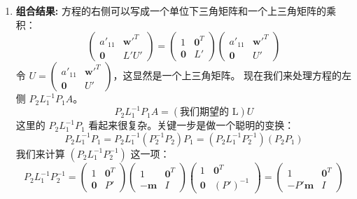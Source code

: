 \documentclass{amsart}
\theoremstyle{plain}
\theoremstyle{definition}
\theoremstyle{remark}
\begin{document}
\begin{enumerate}
我们将这个分解应用到我们的方程中。定义一个分块置换矩阵：
\[
P_2 = \begin{pmatrix} 1 & \mathbf{0}^T \\ \mathbf{0} & P' \end{pmatrix}
\]
将它左乘到方程 $L_1^{-1} P_1 A = \dots$ 的两边：
\[
P_2 (L_1^{-1} P_1 A) = \begin{pmatrix} 1 & \mathbf{0}^T \\ \mathbf{0} & P' \end{pmatrix} \begin{pmatrix} a'_{11} & \mathbf{w'}^T \\ \mathbf{0} & A_{schur} \end{pmatrix} = \begin{pmatrix} a'_{11} & \mathbf{w'}^T \\ \mathbf{0} & P'A_{schur} \end{pmatrix} = \begin{pmatrix} a'_{11} & \mathbf{w'}^T \\ \mathbf{0} & L'U' \end{pmatrix}
\]
	\item \textbf{组合结果:}
方程的右侧可以写成一个单位下三角矩阵和一个上三角矩阵的乘积：
\[
\begin{pmatrix} a'_{11} & \mathbf{w'}^T \\ \mathbf{0} & L'U' \end{pmatrix} = \begin{pmatrix} 1 & \mathbf{0}^T \\ \mathbf{0} & L' \end{pmatrix} \begin{pmatrix} a'_{11} & \mathbf{w'}^T \\ \mathbf{0} & U' \end{pmatrix}
\]
令 $U = \begin{pmatrix} a'_{11} & \mathbf{w'}^T \\ \mathbf{0} & U' \end{pmatrix}$，这显然是一个上三角矩阵。
现在我们来处理方程的左侧 $P_2 L_1^{-1} P_1 A$。
\[
P_2 L_1^{-1} P_1 A = (\text{我们期望的 L}) U
\]
这里的 $P_2 L_1^{-1} P_1$ 看起来很复杂。关键一步是做一个聪明的变换：
\[
P_2 L_1^{-1} P_1 = P_2 L_1^{-1} (P_2^{-1} P_2) P_1 = (P_2 L_1^{-1} P_2^{-1}) (P_2 P_1)
\]
我们来计算 $(P_2 L_1^{-1} P_2^{-1})$ 这一项：
\[
P_2 L_1^{-1} P_2^{-1} = \begin{pmatrix} 1 & \mathbf{0}^T \\ \mathbf{0} & P' \end{pmatrix} \begin{pmatrix} 1 & \mathbf{0}^T \\ -\mathbf{m} & I \end{pmatrix} \begin{pmatrix} 1 & \mathbf{0}^T \\ \mathbf{0} & (P')^{-1} \end{pmatrix} = \begin{pmatrix} 1 & \mathbf{0}^T \\ -P'\mathbf{m} & I \end{pmatrix}
\]
\end{enumerate}
\end{document}
